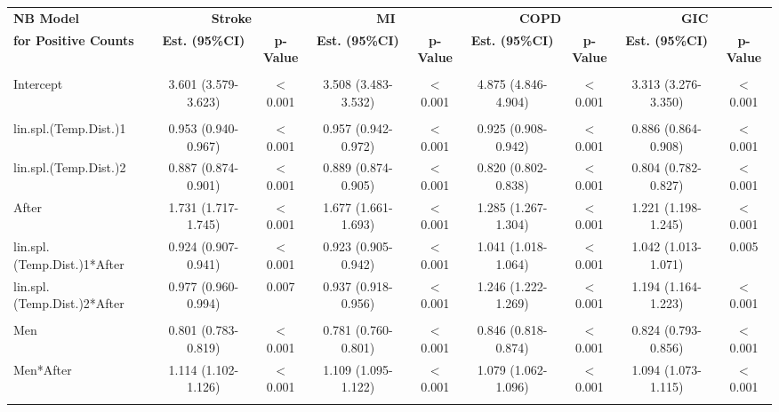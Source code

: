 \begin{landscape}
\begin{table}[htbp]
\begin{tabular}{lcccccccc}
    \midrule
          &       &       &       &       &       &       &       &  \\
    \midrule
    \textbf{NB Model} & \multicolumn{2}{c}{\textbf{Stroke}} & \multicolumn{2}{c}{\textbf{MI}} & \multicolumn{2}{c}{\textbf{COPD}} & \multicolumn{2}{c}{\textbf{GIC}} \\
    \textbf{for Positive Counts} & \textbf{Est. (95\%CI)} & \textbf{p-Value} & \textbf{Est. (95\%CI)} & \textbf{p-Value} & \textbf{Est. (95\%CI)} & \textbf{p-Value} & \textbf{Est. (95\%CI)} & \textbf{p-Value} \\
    \midrule
          &       &       &       &       &       &       &       &  \\
    Intercept & 3.601 (3.579-3.623) & $<$0.001 & 3.508 (3.483-3.532) & $<$0.001 & 4.875 (4.846-4.904) & $<$0.001 & 3.313 (3.276-3.350) & $<$0.001 \\
          &       &       &       &       &       &       &       &  \\
    lin.spl.(Temp.Dist.)1 & 0.953 (0.940-0.967) & $<$0.001 & 0.957 (0.942-0.972) & $<$0.001 & 0.925 (0.908-0.942) & $<$0.001 & 0.886 (0.864-0.908) & $<$0.001 \\
    lin.spl.(Temp.Dist.)2 & 0.887 (0.874-0.901) & $<$0.001 & 0.889 (0.874-0.905) & $<$0.001 & 0.820 (0.802-0.838) & $<$0.001 & 0.804 (0.782-0.827) & $<$0.001 \\
    After & 1.731 (1.717-1.745) & $<$0.001 & 1.677 (1.661-1.693) & $<$0.001 & 1.285 (1.267-1.304) & $<$0.001 & 1.221 (1.198-1.245) & $<$0.001 \\
    lin.spl.(Temp.Dist.)1*After  & 0.924 (0.907-0.941) & $<$0.001 & 0.923 (0.905-0.942) & $<$0.001 & 1.041 (1.018-1.064) & $<$0.001 & 1.042 (1.013-1.071) & 0.005 \\
    lin.spl.(Temp.Dist.)2*After  & 0.977 (0.960-0.994) & 0.007 & 0.937 (0.918-0.956) & $<$0.001 & 1.246 (1.222-1.269) & $<$0.001 & 1.194 (1.164-1.223) & $<$0.001 \\
          &       &       &       &       &       &       &       &  \\
    Men   & 0.801 (0.783-0.819) & $<$0.001 & 0.781 (0.760-0.801) & $<$0.001 & 0.846 (0.818-0.874) & $<$0.001 & 0.824 (0.793-0.856) & $<$0.001 \\
    Men*After & 1.114 (1.102-1.126) & $<$0.001 & 1.109 (1.095-1.122) & $<$0.001 & 1.079 (1.062-1.096) & $<$0.001 & 1.094 (1.073-1.115) & $<$0.001 \\
          &       &       &       &       &       &       &       &  \\

\end{tabular}
\end{table}
\end{landscape}
